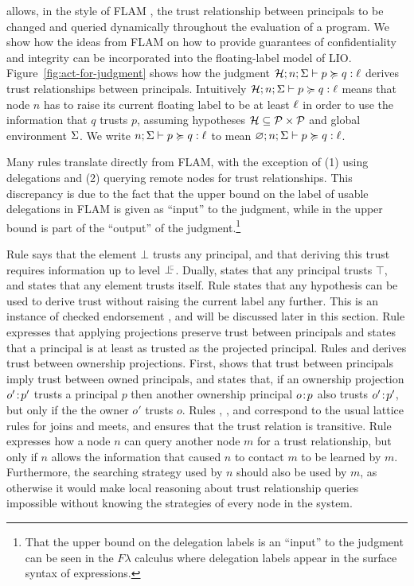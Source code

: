 \lang{} allows, in the style of FLAM \cite{Arden:2015:FA:2859845.2859998}, the trust relationship between principals to be changed and queried dynamically throughout the evaluation of a program. We show how the ideas from FLAM on how to provide guarantees of confidentiality and integrity can be incorporated into the floating-label model of LIO. Figure~\ref{fig:act-for-judgment} shows how the judgment $\mathcal{H}; n; \Sigma \vdash p \succcurlyeq q : \ell$ derives trust relationships between principals. Intuitively $\mathcal{H}; n; \Sigma \vdash p \succcurlyeq q : \ell$ means that node $n$ has to raise its current floating label to be at least $\ell$ in order to use the information that $q$ trusts $p$, assuming hypotheses $\mathcal{H} \subseteq \mathcal{P} \times \mathcal{P}$ and global environment $\Sigma$. We write $n; \Sigma \vdash p \succcurlyeq q : \ell$ to mean $\varnothing; n; \Sigma \vdash p \succcurlyeq q : \ell$.

Many rules translate directly from FLAM, with the exception of (1) using delegations and (2) querying remote nodes for trust relationships. This discrepancy is due to the fact that the upper bound on the label of usable delegations in FLAM is given as ``input'' to the judgment, while in \lang{} the upper bound is part of the ``output'' of the judgment.\footnote{That the upper bound on the delegation labels is an ``input'' to the judgment can be seen in the $F\lambda$ calculus \cite{flamtr} where delegation labels appear in the surface syntax of expressions.}

Rule  says that the element $\bot$ trusts any principal, and that deriving this trust requires information up to level $\botinfoflow$. Dually,  states that any principal trusts $\top$, and  states that any element trusts itself. Rule  states that any hypothesis can be used to derive trust without raising the current label any further. This is an instance of checked endorsement \cite{Chong:2007:SWA:1294261.1294265, DBLP:journals/corr/abs-1107-5594}, and will be discussed later in this section. Rule  expresses that applying projections preserve trust between principals and  states that a principal is at least as trusted as the projected principal. Rules  and  derives trust between ownership projections. First,  shows that trust between principals imply trust between owned principals, and  states that, if an ownership projection $o'\!:\!p'$ trusts a principal $p$ then another ownership principal $o\!:\!p$ also trusts $o'\!:\!p'$, but only if the the owner $o'$ trusts $o$. Rules , ,  and  correspond to the usual lattice rules for joins and meets, and  ensures that the trust relation is transitive. Rule  expresses how a node $n$ can query another node $m$ for a trust relationship, but only if $n$ allows the information that caused $n$ to contact $m$ to be learned by $m$. Furthermore, the searching strategy used by $n$ should also be used by $m$, as otherwise it would make local reasoning about trust relationship queries impossible without knowing the strategies of every node in the system.

